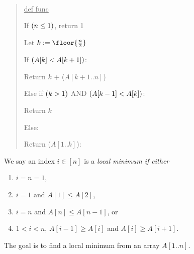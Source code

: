 \documentclass[10pt]{article}
\newcommand{\parof}[1]{\mleft( #1 \mright)}
\begin{document}
\begin{solution}\ %
\begin{quote}%
\noindent\ul{def func }%


\begin{steps}
\item If \( \parof{n \leq 1} \), return 1
  \item Let \( k := \floor{\frac{n}{2}} \)
  \item If \( \parof{A[k] < A[k + 1]} \): %
    \begin{steps}
    \item Return \( k \) + (\( A[k+1..n]\))
    \end{steps}
  \item Else if \( \parof{k > 1} \) AND \( \parof{ A[k-1] < A[k] } \):
    \begin{steps}
    \item Return \( k \)
    \end{steps}
  \item Else:
    \begin{steps}
    \item Return (\( A[1..k] \)):
    \end{steps}
\end{steps}
\end{quote}
\end{solution}
\pagebreak

We say an index \( i \in [n] \) is a \it{local minimum} if either
\begin{enumerate}[label=(\alph*)]
  \item \( i = n = 1 \),
  \item \( i = 1 \) and \( A[1] \leq A[2] \),
  \item \( i = n \) and \( A[n] \leq A[n-1] \), or
  \item \( 1 < i < n \), \( A[i-1] \geq A[i] \) and \( A[i] \geq A[i + 1] \).
\end{enumerate}
The goal is to find a local minimum from an array \( A[1..n] \).
\end{document}
